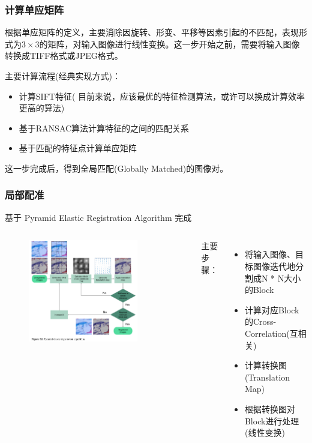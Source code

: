 \documentclass{beamer}
\begin{document}
\begin{frame}
\frametitle{计算单应矩阵}

根据单应矩阵的定义，主要消除因旋转、形变、平移等因素引起的不匹配，表现形式为$3\times3$的矩阵，对输入图像进行线性变换。这一步开始之前，需要将输入图像转换成TIFF格式或JPEG格式。

主要计算流程(经典实现方式)：
\begin{itemize}
\item 计算SIFT特征({\color{red} 目前来说，应该最优的特征检测算法，或许可以换成计算效率更高的算法})
\item 基于RANSAC算法计算特征的之间的匹配关系
\item 基于匹配的特征点计算单应矩阵
\end{itemize}
这一步完成后，得到全局匹配(Globally Matched)的图像对。
\end{frame}

\begin{frame}
\frametitle{局部配准}
基于 Pyramid Elastic Registration Algorithm 完成
\begin{columns}
\begin{figure}
\centering
\includegraphics[width=0.8\textwidth]{Pyramid.png}
\end{figure}

主要步骤：
\begin{itemize}
\item 将输入图像、目标图像迭代地分割成N * N大小的Block
\item 计算对应Block的Cross-Correlation(互相关)
\item 计算转换图(Translation Map)
\item 根据转换图对Block进行处理(线性变换)
\end{itemize}

\end{columns}
\end{frame}
\end{document}
